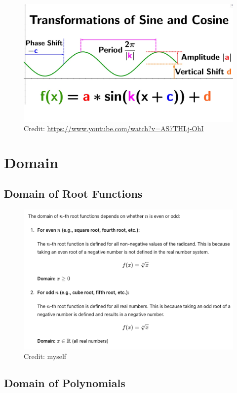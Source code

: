 \documentclass[12pt]{article}
\begin{document}
\begin{figure}[H]
	\centering
	\includegraphics[width=\textwidth]{maxresdefault.jpg}
	\caption{Credit: \url{https://www.youtube.com/watch?v=AS7THLj-OhI}}
\end{figure}

\section{Domain}

\subsection{Domain of Root Functions}

\begin{figure}[H]
	\centering
	\includegraphics[width=\textwidth]{root.png}
	\caption{Credit: myself}
\end{figure}

\subsection{Domain of Polynomials}
\end{document}
